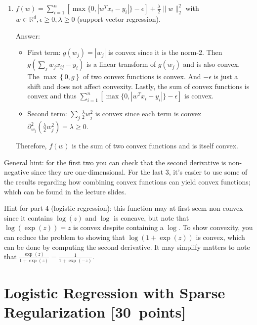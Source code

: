 \documentclass{article}
\newenvironment{answer}{\par\begingroup\color{gre}Answer: }{\endgroup}
\newcommand\pts[1]{\textcolor{pointscolour}{[#1~points]}}
\def\R{\mathbb{R}}
\newcommand{\norm}[1]{\lVert #1 \rVert}
\begin{document}
\begin{enumerate}
\item $f(w) = \sum_{i=1}^n[\max\{0,|w^Tx_i - y_i|\} - \epsilon] + \frac{\lambda}{2}\norm{w}_2^2$  with $w \in \R^d, \epsilon \geq 0, \lambda \geq 0$ (support vector regression).
\begin{answer}
\begin{itemize}
    \item First term: $g(w_j) = |w_j|$ is convex since it is the norm-2. Then $g\left( \sum_{j} w_j x_{ij} - y_i \right)$ is a linear transform of $g(w_j)$ and is also convex. The $\max\left\{ 0, g \right\}$ of two convex functions is convex. And $-\epsilon$ is just a shift and does not affect convexity. Lastly, the sum of convex functions is convex and thus $\sum_{i=1}^n[\max\{0,|w^Tx_i - y_i|\} - \epsilon]$ is convex.
    \item Second term: $\sum_j \frac{\lambda}{2} w_j^2$ is convex since each term is convex $\partial^2_{w_j} \left( \frac{\lambda}{2} w_j^2 \right) = \lambda \geq 0$.
\end{itemize}
    Therefore, $f(w)$ is the sum of two convex functions and is itself convex.
\end{answer}
\end{enumerate}

General hint: for the first two you can check that the second derivative is non-negative since they are one-dimensional. For the last 3, it's easier to use some of the results regarding how combining convex functions can yield convex functions; which can be found in the lecture slides.

Hint for part 4 (logistic regression): this function may at first seem non-convex since it contains $\log(z)$ and $\log$ is concave, but note that $\log(\exp(z))=z$ is convex despite containing a $\log$. To show convexity, you can reduce the problem to showing that $\log(1+\exp(z))$ is convex, which can be done by computing the second derivative. It may simplify matters to note that $\frac{\exp(z)}{1+\exp(z)} = \frac{1}{1+\exp(-z)}$.


\clearpage
\section{Logistic Regression with Sparse Regularization \pts{30}}
\end{document}
